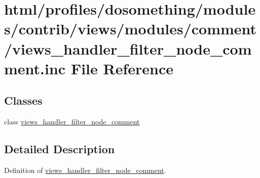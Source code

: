 \hypertarget{views__handler__filter__node__comment_8inc}{
\section{html/profiles/dosomething/modules/contrib/views/modules/comment/views\_\-handler\_\-filter\_\-node\_\-comment.inc File Reference}
\label{views__handler__filter__node__comment_8inc}
}
\subsection*{Classes}
\begin{DoxyCompactItemize}
\item 
class \hyperlink{classviews__handler__filter__node__comment}{views\_\-handler\_\-filter\_\-node\_\-comment}
\end{DoxyCompactItemize}


\subsection{Detailed Description}
Definition of \hyperlink{classviews__handler__filter__node__comment}{views\_\-handler\_\-filter\_\-node\_\-comment}. 